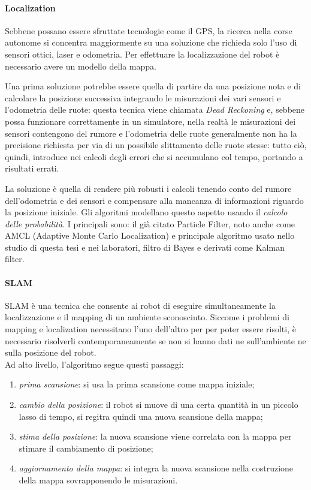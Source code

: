 \paragraph{Localization}
Sebbene possano essere sfruttate tecnologie come il GPS, la ricerca nella corse autonome si concentra
maggiormente su una soluzione che richieda solo l'uso di sensori ottici, laser e odometria.
Per effettuare la localizzazione del robot è necessario avere un modello della mappa.

Una prima soluzione potrebbe essere quella di partire da una posizione nota e di calcolare la posizione
successiva integrando le misurazioni dei vari sensori e l'odometria delle ruote: questa tecnica
viene chiamata \textit{Dead Reckoning} e, sebbene possa funzionare correttamente in un simulatore, nella
realtà le misurazioni dei sensori contengono del rumore e l'odometria delle ruote generalmente non ha
la precisione richiesta per via di un possibile slittamento delle ruote stesse: tutto ciò, quindi,
introduce nei calcoli degli errori che si accumulano col tempo, portando a risultati errati.

La soluzione è quella di rendere più robusti i calcoli tenendo conto del rumore dell'odometria e dei sensori
e compensare alla mancanza di informazioni riguardo la posizione iniziale. Gli algoritmi modellano questo
aspetto usando il \textit{calcolo delle probabilità}. I principali sono: il già citato Particle Filter,
noto anche come AMCL (Adaptive Monte Carlo Localization) e principale algoritmo usato nello studio di
questa tesi e nei laboratori, filtro di Bayes e derivati come Kalman filter.


\paragraph{SLAM}
SLAM è una tecnica che consente ai robot di eseguire simultaneamente la localizzazione e il mapping
di un ambiente sconosciuto. Siccome i problemi di mapping e localization necessitano l'uno dell'altro
per per poter essere risolti, è necessario risolverli contemporaneamente se non si hanno dati
ne sull'ambiente ne sulla posizione del robot.\\
Ad alto livello, l'algoritmo segue questi passaggi:
\begin{enumerate}
	\item \textit{prima scansione}: si usa la prima scansione come mappa iniziale;
	\item \textit{cambio della posizione}: il robot si muove di una certa quantità in un piccolo
	      lasso di tempo, si regitra quindi una nuova scansione della mappa;
	\item \textit{stima della posizione}: la nuova scansione viene correlata con la mappa per
	      stimare il cambiamento di posizione;
	\item \textit{aggiornamento della mappa}: si integra la nuova scansione nella costruzione della mappa
	      sovrapponendo le misurazioni.
\end{enumerate}

